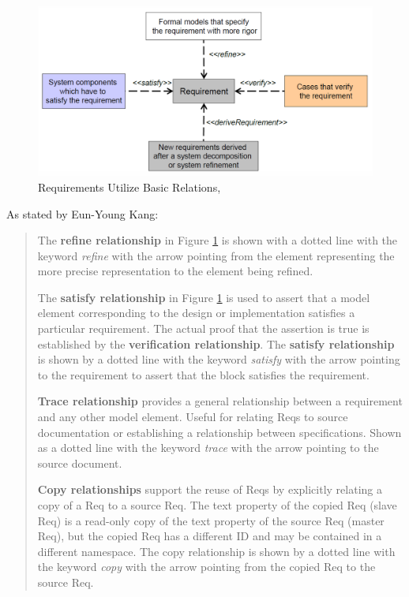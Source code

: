 \begin{figure}[hbt]
    \centering
    \caption{Requirements Utilize Basic Relations, \cite{WormKangLec72024}}
    \label{fig:requirement-diagram-relations}
    \includegraphics[width=0.9\linewidth]{images/Requirements basic relations.png}
\end{figure}
As stated by Eun-Young Kang:
\begin{quote}
The \textbf{refine relationship} in Figure \ref{fig:requirement-diagram-relations} is shown with a dotted line with the keyword \textit{refine} with the arrow pointing from the element representing the more precise representation to the element being refined.

The \textbf{satisfy relationship} in Figure \ref{fig:requirement-diagram-relations} is used to assert that a model element corresponding to the design or implementation satisfies a particular requirement. The actual proof that the assertion is true is established by the \textbf{verification relationship}. The \textbf{satisfy relationship} is shown by a dotted line with the keyword \textit{satisfy} with the arrow pointing to the requirement to assert that the block satisfies the requirement.

\textbf{Trace relationship} provides a general relationship between a requirement and any other model element. Useful for relating Reqs to source documentation or establishing a relationship between specifications. Shown as a dotted line with the keyword \textit{trace} with the arrow pointing to the source document.

\textbf{Copy relationships} support the reuse of Reqs by explicitly relating a copy of a Req to a source Req. The text property of the copied Req (slave Req) is a read-only copy of the text property of the source Req (master Req), but the copied Req has a different ID and may be contained in a different namespace. The copy relationship is shown by a dotted line with the keyword \textit{copy} with the arrow pointing from the copied Req to the source Req.
\end{quote}

